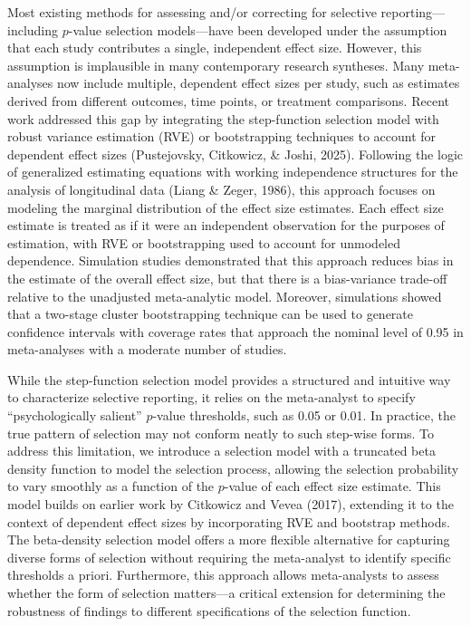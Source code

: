 \documentclass[
  american,
  man, donotrepeattitle,floatsintext]{apa7}
\begin{document}
Most existing methods for assessing and/or correcting for selective reporting---including \(p\)-value selection models---have been developed under the assumption that each study contributes a single, independent effect size.
However, this assumption is implausible in many contemporary research syntheses.
Many meta-analyses now include multiple, dependent effect sizes per study, such as estimates derived from different outcomes, time points, or treatment comparisons.
Recent work addressed this gap by integrating the step-function selection model with robust variance estimation (RVE) or bootstrapping techniques to account for dependent effect sizes (Pustejovsky, Citkowicz, \& Joshi, 2025).
Following the logic of generalized estimating equations with working independence structures for the analysis of longitudinal data (Liang \& Zeger, 1986), this approach focuses on modeling the marginal distribution of the effect size estimates.
Each effect size estimate is treated as if it were an independent observation for the purposes of estimation, with RVE or bootstrapping used to account for unmodeled dependence.
Simulation studies demonstrated that this approach reduces bias in the estimate of the overall effect size, but that there is a bias-variance trade-off relative to the unadjusted meta-analytic model.
Moreover, simulations showed that a two-stage cluster bootstrapping technique can be used to generate confidence intervals with coverage rates that approach the nominal level of 0.95 in meta-analyses with a moderate number of studies.

While the step-function selection model provides a structured and intuitive way to characterize selective reporting, it relies on the meta-analyst to specify ``psychologically salient'' \(p\)-value thresholds, such as 0.05 or 0.01.
In practice, the true pattern of selection may not conform neatly to such step-wise forms.
To address this limitation, we introduce a selection model with a truncated beta density function to model the selection process, allowing the selection probability to vary smoothly as a function of the \(p\)-value of each effect size estimate.
This model builds on earlier work by Citkowicz and Vevea (2017), extending it to the context of dependent effect sizes by incorporating RVE and bootstrap methods.
The beta-density selection model offers a more flexible alternative for capturing diverse forms of selection without requiring the meta-analyst to identify specific thresholds a priori.
Furthermore, this approach allows meta-analysts to assess whether the form of selection matters---a critical extension for determining the robustness of findings to different specifications of the selection function.
\end{document}
